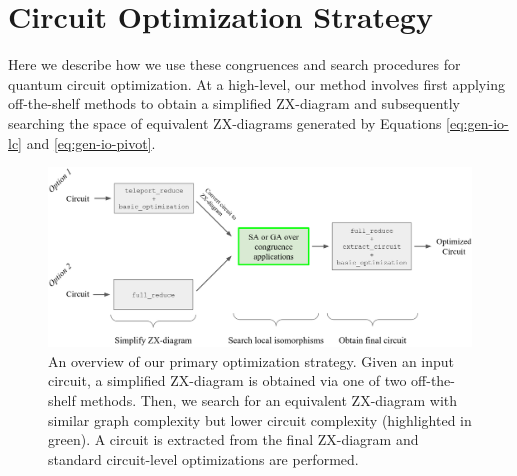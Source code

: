 \section{Circuit Optimization Strategy}\label{sec:strategy}

Here we describe how we use these congruences and search procedures for quantum circuit optimization.
At a high-level, our method involves first applying off-the-shelf methods to obtain a simplified ZX-diagram and subsequently searching the space of equivalent ZX-diagrams generated by Equations \ref{eq:gen-io-lc} and \ref{eq:gen-io-pivot}.


\begin{figure}[t]
\centering
\includegraphics[width=15cm]{img/primary-overview.png}
\caption{
  An overview of our primary optimization strategy.
  Given an input circuit, a simplified ZX-diagram is obtained via one of two off-the-shelf methods.
  Then, we search for an equivalent ZX-diagram with similar graph complexity but lower circuit complexity (highlighted in green).
  A circuit is extracted from the final ZX-diagram and standard circuit-level optimizations are performed.
}
\label{fig:primary}
\end{figure}


